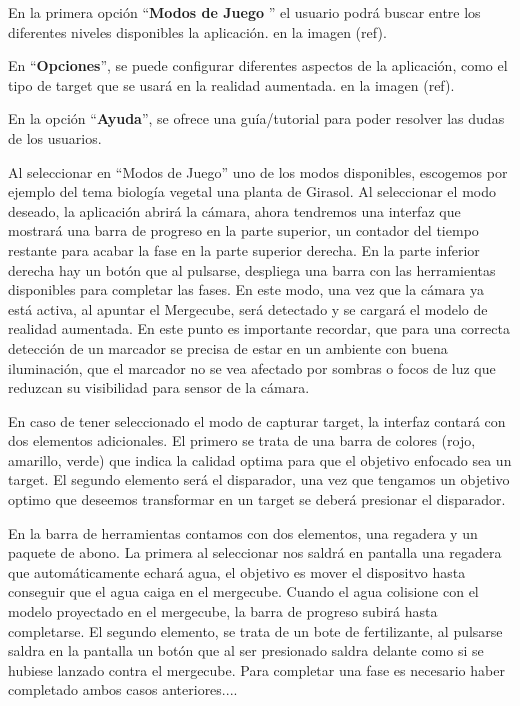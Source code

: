 En la primera opción ``\textbf{Modos de Juego} '' el usuario podrá buscar entre los diferentes niveles disponibles la aplicación. en la imagen (ref).

En ``\textbf{Opciones}'', se puede configurar diferentes aspectos de la aplicación, como el tipo de target que se usará en la realidad aumentada. en la imagen (ref).

En la opción ``\textbf{Ayuda}'', se ofrece una guía/tutorial para poder resolver las dudas de los usuarios.

Al seleccionar en ``Modos de Juego'' uno de los modos disponibles, escogemos por ejemplo del tema biología vegetal una planta de Girasol. Al seleccionar el modo deseado, la aplicación abrirá la cámara, ahora tendremos una interfaz que mostrará una barra de progreso en la parte superior, un contador del tiempo restante para acabar la fase en la parte superior derecha. En la parte inferior derecha hay un botón que al pulsarse, despliega una barra con las herramientas disponibles para completar las fases.
En este modo, una vez que la cámara ya está activa, al apuntar el Mergecube, será detectado y se cargará el modelo de realidad aumentada. En este punto es importante recordar, que para una correcta detección de un marcador se precisa de estar en un ambiente con buena iluminación, que el marcador no se vea afectado por sombras o focos de luz que reduzcan su visibilidad para sensor de la cámara.

En caso de tener seleccionado el modo de capturar target, la interfaz contará con dos elementos adicionales. El primero se trata de una barra de colores (rojo, amarillo, verde) que indica la calidad optima para que el objetivo enfocado sea un target. El segundo elemento será el disparador, una vez que tengamos un objetivo optimo que deseemos transformar en un target se deberá presionar el disparador.

En la barra de herramientas contamos con dos elementos, una regadera y un paquete de abono. La primera al seleccionar nos saldrá en pantalla una regadera que automáticamente echará agua, el objetivo es mover el dispositvo hasta conseguir que el agua caiga en el mergecube. Cuando el agua colisione con el modelo proyectado en el mergecube, la barra de progreso subirá hasta completarse. El segundo elemento, se trata de un bote de fertilizante, al pulsarse saldra en la pantalla un botón que al ser presionado saldra delante como si se hubiese lanzado contra el mergecube.
Para completar una fase es necesario haber completado ambos casos anteriores....


 

